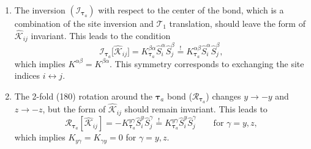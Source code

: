 \documentclass[aps, prx, nofootinbib, preprintnumbers, superscriptaddress]{revtex4-2}
\begin{document}
\begin{enumerate}[label = (\roman*)]
    \item The inversion $(\mathcal{I}_{\boldsymbol\tau_{a}})$ with respect to the center of the bond, which is a combination of the site inversion and $\mathcal{T}_{1}$ translation, should leave the form of $\hat{\mathcal{K}}_{ij}$ invariant. This leads to the condition
    \begin{equation}
        \mathcal{I}_{\boldsymbol\tau_{a}} \big[ \hat{\mathcal{K}}_{ij} \big] 
        = K_{\boldsymbol\tau_{a}}^{\beta\alpha} \hat{S}^{\alpha}_{i} \hat{S}^{\beta}_{j}
        \overset{!}{=} K_{\boldsymbol\tau_{a}}^{\alpha\beta} \hat{S}^{\alpha}_{i} \hat{S}^{\beta}_{j},
    \end{equation}
    which implies $K^{\alpha\beta} = K^{\beta\alpha}$. This symmetry corresponds to exchanging the site indices $i \leftrightarrow j$.
    
    \item The 2-fold (180\textdegree) rotation around the $\boldsymbol\tau_{a}$ bond ($\mathcal{R}_{\boldsymbol\tau_{a}}$) changes $y \to -y$ and $z \to -z$, but the form of $\hat{\mathcal{K}}_{ij}$ should remain invariant. This leads to
    \begin{equation}
        \mathcal{R}_{\boldsymbol\tau_{a}} [ \hat{\mathcal{K}}_{ij} ]
        = - K_{\boldsymbol\tau_{a}}^{y\gamma} \hat{S}_{i}^{y} \hat{S}_{j}^{\gamma}
        \overset{!}{=} K_{\boldsymbol\tau_{a}}^{y\gamma} \hat{S}_{i}^{y} \hat{S}_{j}^{\gamma}
        \qquad \text{for } \gamma = y, z,
    \end{equation}
    which implies $K_{y\gamma} = K_{\gamma y} = 0$ for $\gamma = y, z$.
\end{enumerate}



\end{document}
